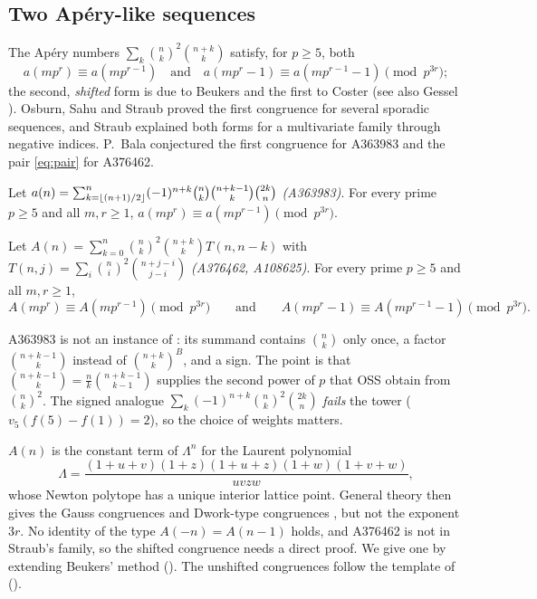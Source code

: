 \documentclass[11pt]{amsart}
\begin{document}
\subsection*{Two Ap\'ery-like sequences}
The Ap\'ery numbers $\sum_k\binom nk^2\binom{n+k}k$ satisfy, for $p\ge5$, both
\begin{equation}\label{eq:pair}
a(mp^r)\equiv a(mp^{r-1})\quad\text{and}\quad a(mp^r-1)\equiv a(mp^{r-1}-1)\pmod{p^{3r}};
\end{equation}
the second, \emph{shifted} form is due to Beukers \cite{beukers1985} and the first to Coster \cite{coster1988} (see also Gessel \cite{gessel1982}). Osburn, Sahu and Straub \cite{oss2016} proved the first congruence for several sporadic sequences, and Straub \cite{straub2014} explained both forms for a multivariate family through negative indices. P.~Bala \cite{bala} conjectured the first congruence for A363983 and the pair \eqref{eq:pair} for A376462.

\begin{theorem}\label{thm:363983}
Let $a(n)=\sum_{k=\left\lfloor (n+1)/2\right\rfloor}^{n}(-1)^{n+k}\binom nk\binom{n+k-1}k\binom{2k}n$ \emph{(A363983)}. For every prime $p\ge5$ and all $m,r\ge1$, $a(mp^r)\equiv a(mp^{r-1})\pmod{p^{3r}}$.
\end{theorem}

\begin{theorem}\label{thm:376462}
Let $A(n)=\sum_{k=0}^{n}\binom nk^2\binom{n+k}{k}T(n,n-k)$ with $T(n,j)=\sum_{i}\binom ni^2\binom{n+j-i}{j-i}$ \emph{(A376462, A108625)}. For every prime $p\ge5$ and all $m,r\ge1$,
\[ A(mp^r)\equiv A(mp^{r-1})\pmod{p^{3r}}\qquad\text{and}\qquad A(mp^r-1)\equiv A(mp^{r-1}-1)\pmod{p^{3r}}. \]
\end{theorem}

A363983 is not an instance of \cite[Thm.~1.2]{oss2016}: its summand contains $\binom nk$ only once, a factor $\binom{n+k-1}k$ instead of $\binom{n+k}k^B$, and a sign. The point is that $\binom{n+k-1}k=\frac nk\binom{n+k-1}{k-1}$ supplies the second power of $p$ that OSS obtain from $\binom nk^2$. The signed analogue $\sum_k(-1)^{n+k}\binom nk^2\binom{2k}n$ \emph{fails} the tower ($v_5(f(5)-f(1))=2$), so the choice of weights matters.

$A(n)$ is the constant term of $\Lambda^n$ for the Laurent polynomial
\[ \Lambda=\frac{(1+u+v)(1+z)(1+u+z)(1+w)(1+v+w)}{uvzw}, \]
whose Newton polytope has a unique interior lattice point. General theory then gives the Gauss congruences and Dwork-type congruences \cite{mellitvlasenko2013,bv3}, but not the exponent $3r$. No identity of the type $A(-n)=A(n-1)$ holds, and A376462 is not in Straub's family, so the shifted congruence needs a direct proof. We give one by extending Beukers' method (). The unshifted congruences follow the template of \cite{oss2016} ().
\end{document}
